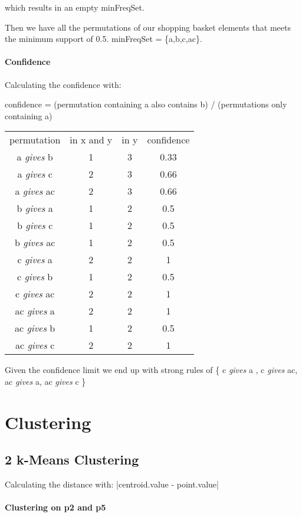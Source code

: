 \documentclass[12pt, a4paper]{article}
\begin{document}
which results in an empty minFreqSet. 

Then we have all the permutations of our shopping basket elements that meets the minimum support of 0.5. 
minFreqSet = \{a,b,c,ac\}.

\paragraph{Confidence}
Calculating the confidence with: 

confidence = (permutation containing a also contains b) / (permutations only containing a)

\begin{tabular}{ c c c c }
permutation & in x and y & in y & confidence \\
a \textit{gives} b & 1 & 3 & 0.33 \\
a \textit{gives} c & 2 & 3 & 0.66 \\
a \textit{gives} ac & 2 & 3 & 0.66 \\
b \textit{gives} a & 1 & 2 & 0.5 \\
b \textit{gives} c & 1 & 2 & 0.5 \\
b \textit{gives} ac & 1 & 2 & 0.5  \\
c \textit{gives} a & 2 & 2 & 1 \\
c \textit{gives} b & 1 & 2 & 0.5  \\
c \textit{gives} ac & 2 & 2 & 1 \\
ac \textit{gives} a & 2 & 2 & 1 \\
ac \textit{gives} b & 1 & 2 & 0.5 \\
ac \textit{gives} c & 2 & 2 & 1 \\
\end{tabular}

Given the confidence limit we end up with strong rules of 
\{ c \textit{gives} a , c \textit{gives} ac, ac \textit{gives} a, ac \textit{gives} c \}

\section{Clustering}
\subsection{2 k-Means Clustering}
Calculating the distance with: |centroid.value - point.value|

\paragraph{Clustering on p2 and p5}
\end{document}
